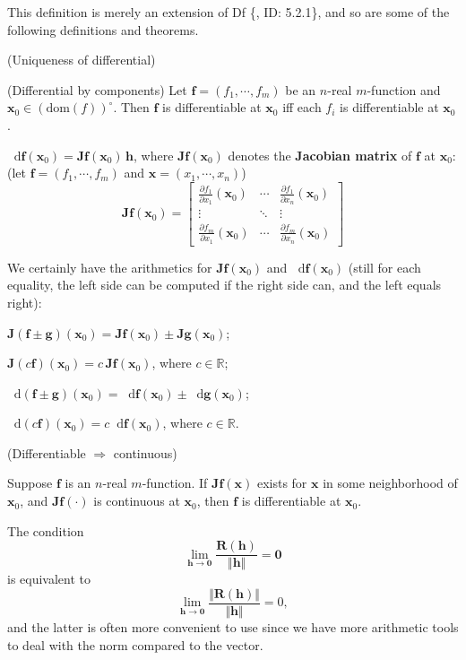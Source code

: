 \documentclass{article}
\newcommand{\parfrac}[2]{\frac{\partial #1}{\partial #2}}
\newcommand{\dif}{\mathop{}\!\mathrm{d}}
\begin{document}
\begin{Rmk}{}
    This definition is merely an extension of Df \{, ID: 5.2.1\}, and so are some of the following definitions and theorems.
    \begin{compactenum}
        \item \textcolor{Th}{(Uniqueness of differential)}
        \item \textcolor{Th}{(Differential by components) Let $\pmb{f} = (f_1, \cdots, f_m)$ be an $n$-real $m$-function and $\pmb{x}_0\in (\text{dom}(f))^\circ$. Then $\pmb{f}$ is differentiable at $\pmb{x}_0$ iff each $f_i$ is differentiable at $\pmb{x}_0$.}
        \item \textcolor{Th}{$\dif \pmb{f}(\pmb{x}_0) = \pmb{Jf}(\pmb{x}_0)\,\pmb{h}$,} \textcolor{Df}{where $\pmb{Jf}(\pmb{x}_0)$ denotes the \textbf{Jacobian matrix} of $\pmb{f}$ at $\pmb{x}_0$: (let $\pmb{f} = (f_1, \cdots, f_m)$ and $\pmb{x} = (x_1, \cdots, x_n)$)
        $$ \pmb{Jf}(\pmb{x}_0) = \begin{bmatrix}
            \parfrac{f_1}{x_1}(\pmb{x}_0) & \cdots & \parfrac{f_1}{x_n}(\pmb{x}_0)\\
            \vdots & \ddots & \vdots\\
            \parfrac{f_m}{x_1}(\pmb{x}_0) & \cdots & \parfrac{f_m}{x_n}(\pmb{x}_0)
        \end{bmatrix}
        $$}
        \item We certainly have the arithmetics for $\pmb{Jf}(\pmb{x}_0)$ and $\dif\pmb{f}(\pmb{x}_0)$ (still for each equality, the left side can be computed if the right side can, and the left equals right):
        \begin{compactenum}
            \item $\pmb{J}(\pmb{f\pm g})(\pmb{x}_0) = \pmb{Jf}(\pmb{x}_0)\pm\pmb{Jg}(\pmb{x}_0)$;
            \item $\pmb{J}(c\pmb{f})(\pmb{x}_0) = c\,\pmb{Jf}(\pmb{x}_0)$, where $c\in\mathbb{R}$;
            \item $\dif(\pmb{f}\pm\pmb{g})(\pmb{x}_0) = \dif \pmb{f}(\pmb{x}_0)\pm\dif \pmb{g}(\pmb{x}_0)$;
            \item $\dif(c\pmb{f})(\pmb{x}_0) = c\dif \pmb{f}(\pmb{x}_0)$, where $c\in\mathbb{R}$.
        \end{compactenum}
        \item \textcolor{Th}{(Differentiable $\Rightarrow$ continuous)}
        \item \textcolor{Th}{Suppose $\pmb{f}$ is an $n$-real $m$-function. If $\pmb{Jf}(\pmb{x})$ exists for $\pmb{x}$ in some neighborhood of $\pmb{x}_0$, and $\pmb{Jf}(\cdot)$ is continuous at $\pmb{x}_0$, then $\pmb{f}$ is differentiable at $\pmb{x}_0$.}
        \item The condition 
        $$ \lim_{\pmb{h}\to \pmb{0}}\frac{\pmb{R}(\pmb{h})}{\Vert \pmb{h}\Vert} = \pmb{0} $$
        is equivalent to 
        $$ \lim_{\pmb{h}\to \pmb{0}}\frac{\Vert \pmb{R}(\pmb{h})\Vert}{\Vert \pmb{h}\Vert} = 0, $$
        and the latter is often more convenient to use since we have more arithmetic tools to deal with the norm compared to the vector.
    \end{compactenum}
\end{Rmk}
\end{document}
